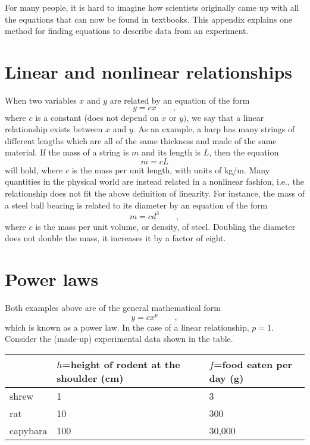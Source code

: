 For many people, it is hard to imagine how scientists
originally came up with all the equations that can now be
found in textbooks.  This appendix explains one method for
finding equations to describe data from an experiment.

\section*{Linear and nonlinear relationships}
When two variables $x$ and $y$ are related by an equation of the form
\begin{equation*}
		y  =  cx   \qquad   ,  
\end{equation*}
where $c$ is a constant (does not depend on $x$ or $y)$, we
say that a linear relationship exists between $x$ and $y$. 
As an example, a harp has many strings of different lengths
which are all of the same thickness and made of the same
material.  If the mass of a string is $m$ and its length is
$L$, then the equation
\begin{equation*}
		m  =  cL  
\end{equation*}
will hold, where $c$ is the mass per unit length, with units of kg/m.
Many quantities in the physical world are instead related in
a nonlinear fashion, i.e., the relationship does not fit the
above definition of linearity.  For instance, the mass of a
steel ball bearing is related to its diameter by an
equation of the form
\begin{equation*}
		m  =  cd^3   \qquad   ,  
\end{equation*}
where $c$ is the mass per unit volume, or density, of steel.
 Doubling the diameter does not double the mass, it
increases it by a factor of eight.

\section*{Power laws}
Both examples above are of the general mathematical form
\begin{equation*}
		y  =  cx^p   \qquad   ,  
\end{equation*}
which is known as a power law.  In the case of a linear
relationship, $p=1$.  Consider the (made-up) experimental
data shown in the table.

\begin{tabular}{lp{30mm}p{30mm}}
			& $h$=height of rodent at the shoulder (cm) & $f$=food eaten per day (g) \\
\hline
	shrew	&	1	& 3\\
	rat		&	10	& 300\\
	capybara	& 100	& 30,000
\end{tabular}

